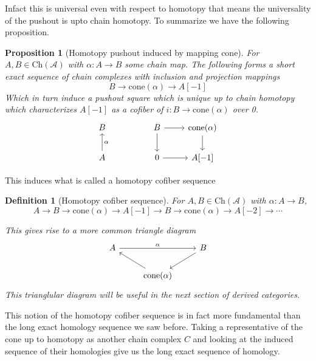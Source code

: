 \documentclass[12pt]{report}
\numberwithin{equation}{section}
\newtheorem{definition}[dummy]{Definition}
\newtheorem{proposition}[dummy]{Proposition}
\begin{document}
	Infact this is universal even with respect to homotopy that means the universality of the pushout is upto chain homotopy. To summarize we have the following proposition.
	\begin{proposition}[Homotopy pushout induced by mapping cone]
		For $A, B \in \mathrm{Ch}(\mathcal{A})$ with $\alpha: A \to B$ some chain map. The following forms a short exact sequence of chain complexes with inclusion and projection mappings
		\[ B \rightarrow \mathrm{cone}(\alpha) \rightarrow A[-1] \] 
		Which in turn induce a pushout square which is unique up to chain homotopy which characterizes $A[-1]$ as a cofiber of $i: B \to \mathrm{cone}(\alpha)$ over 0.
		\[\begin{tikzcd}
			B && B & {\mathrm{cone}(\alpha)} \\
			A && 0 & {A[-1]}
			\arrow[from=1-3, to=1-4]
			\arrow["\alpha"', from=2-1, to=1-1]
			\arrow[from=1-4, to=2-4]
			\arrow[from=1-3, to=2-3]
			\arrow[from=2-3, to=2-4]
		\end{tikzcd}\]
	\end{proposition}
	This induces what is called a homotopy cofiber sequence 
	\begin{definition}[Homotopy cofiber sequence]
		For $A, B \in \mathrm{Ch}(\mathcal{A})$ with $\alpha: A \to B$,
		\[ A \to B \to \mathrm{cone}(\alpha)\to A[-1] \to B \to \mathrm{cone}(\alpha)\to A[-2] \to \cdots \]
		
		This gives rise to a more common triangle diagram 
		\[\begin{tikzcd}
			A && B \\
			& {\mathrm{cone}(\alpha)}
			\arrow["\alpha", from=1-1, to=1-3]
			\arrow[from=1-3, to=2-2]
			\arrow[from=2-2, to=1-1]
		\end{tikzcd}\]
		This trianglular diagram will be useful in the next section of derived categories.
	\end{definition}
	This notion of the homotopy cofiber sequence is in fact more fundamental than the long exact homology sequence we saw before. Taking a representative of the cone up to homotopy as another chain complex $C$ and looking at the induced sequence of their homologies give us the long exact sequence of homology.
	
	
	
\end{document}
